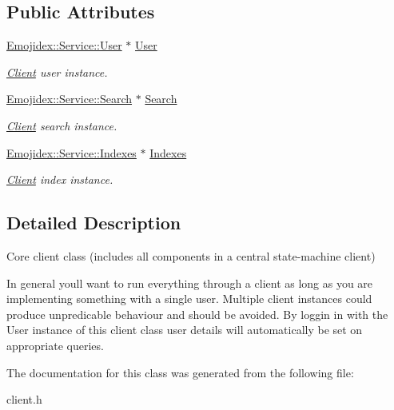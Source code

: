 \subsection*{Public Attributes}
\begin{DoxyCompactItemize}
\item 
\hyperlink{classEmojidex_1_1Service_1_1User}{Emojidex\+::\+Service\+::\+User} $\ast$ \hyperlink{classEmojidex_1_1Client_aa81c4d93a3c5f7c052ec51480940bcf9}{User}\hypertarget{classEmojidex_1_1Client_aa81c4d93a3c5f7c052ec51480940bcf9}{}\label{classEmojidex_1_1Client_aa81c4d93a3c5f7c052ec51480940bcf9}

\begin{DoxyCompactList}\small\item\em \hyperlink{classEmojidex_1_1Client}{Client} user instance. \end{DoxyCompactList}\item 
\hyperlink{classEmojidex_1_1Service_1_1Search}{Emojidex\+::\+Service\+::\+Search} $\ast$ \hyperlink{classEmojidex_1_1Client_a78ab88058c7ae2b4ca94912da4dde033}{Search}\hypertarget{classEmojidex_1_1Client_a78ab88058c7ae2b4ca94912da4dde033}{}\label{classEmojidex_1_1Client_a78ab88058c7ae2b4ca94912da4dde033}

\begin{DoxyCompactList}\small\item\em \hyperlink{classEmojidex_1_1Client}{Client} search instance. \end{DoxyCompactList}\item 
\hyperlink{classEmojidex_1_1Service_1_1Indexes}{Emojidex\+::\+Service\+::\+Indexes} $\ast$ \hyperlink{classEmojidex_1_1Client_a1b05ff602e2be8497d6def01c52d5a23}{Indexes}\hypertarget{classEmojidex_1_1Client_a1b05ff602e2be8497d6def01c52d5a23}{}\label{classEmojidex_1_1Client_a1b05ff602e2be8497d6def01c52d5a23}

\begin{DoxyCompactList}\small\item\em \hyperlink{classEmojidex_1_1Client}{Client} index instance. \end{DoxyCompactList}\end{DoxyCompactItemize}


\subsection{Detailed Description}
Core client class (includes all components in a central state-\/machine client) 

In general you\textquotesingle{}ll want to run everything through a client as long as you are implementing something with a single user. Multiple client instances could produce unpredicable behaviour and should be avoided. By loggin in with the User instance of this client class user details will automatically be set on appropriate queries. 

The documentation for this class was generated from the following file\+:\begin{DoxyCompactItemize}
\item 
client.\+h\end{DoxyCompactItemize}
